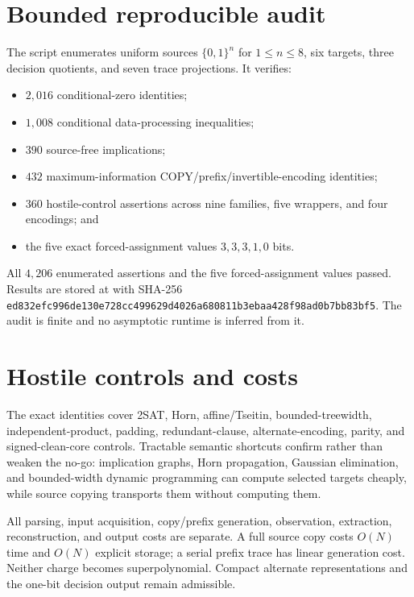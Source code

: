 \documentclass[11pt]{article}
\begin{document}
\section*{Bounded reproducible audit}
The script
enumerates uniform sources $\{0,1\}^n$ for $1\le n\le8$, six targets, three
decision quotients, and seven trace projections.  It verifies:
\begin{itemize}
\item $2{,}016$ conditional-zero identities;
\item $1{,}008$ conditional data-processing inequalities;
\item $390$ source-free implications;
\item $432$ maximum-information COPY/prefix/invertible-encoding identities;
\item $360$ hostile-control assertions across nine families, five wrappers,
and four encodings; and
\item the five exact forced-assignment values $3,3,3,1,0$ bits.
\end{itemize}
All $4{,}206$ enumerated assertions and the five forced-assignment values
passed.  Results are stored at
with SHA-256
\texttt{ed832efc996de130e728cc499629d4026a680811b3ebaa428f98ad0b7bb83bf5}.
The audit is finite and no asymptotic runtime is inferred from it.

\section*{Hostile controls and costs}
The exact identities cover 2SAT, Horn, affine/Tseitin, bounded-treewidth,
independent-product, padding, redundant-clause, alternate-encoding, parity,
and signed-clean-core controls.  Tractable semantic shortcuts confirm rather
than weaken the no-go: implication graphs, Horn propagation, Gaussian
elimination, and bounded-width dynamic programming can compute selected
targets cheaply, while source copying transports them without computing them.

All parsing, input acquisition, copy/prefix generation, observation,
extraction, reconstruction, and output costs are separate.  A full source
copy costs $O(N)$ time and $O(N)$ explicit storage; a serial prefix trace has
linear generation cost.  Neither charge becomes superpolynomial.  Compact
alternate representations and the one-bit decision output remain admissible.
\end{document}
